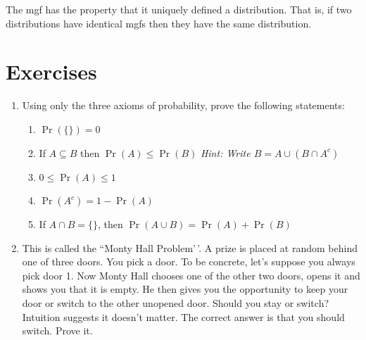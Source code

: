 \documentclass[
]{book}
\providecommand{\tightlist}{%
  \setlength{\itemsep}{0pt}\setlength{\parskip}{0pt}}
\theoremstyle{definition}
\theoremstyle{definition}
\theoremstyle{definition}
\theoremstyle{definition}
\theoremstyle{remark}
\begin{document}
The mgf has the property that it uniquely defined a distribution.
That is, if two distributions have identical mgfs then they have the same distribution.

\hypertarget{exercises}{%
\section{Exercises}\label{exercises}}

\begin{enumerate}
\def\labelenumi{\arabic{enumi}.}
\item
  Using only the three axioms of probability, prove the following statements:

  \begin{enumerate}
  \def\labelenumii{(\alph{enumii})}
  \tightlist
  \item
    \(\Pr(\{\})=0\)
  \item
    If \(A \subseteq B\) then \(\Pr(A) \leq \Pr(B)\) \emph{Hint: Write \(B = A \cup (B \cap A^c)\)}
  \item
    \(0 \leq \Pr(A) \leq 1\)
  \item
    \(\Pr(A^c)=1-\Pr(A)\)
  \item
    If \(A \cap B = \{\}\), then \(\Pr(A\cup B) = \Pr(A) + \Pr(B)\)
  \end{enumerate}
\item
  This is called the ``Monty Hall Problem'\,'. A prize is placed at random behind one of three doors. You pick a door. To be concrete, let's suppose you always pick door 1. Now Monty Hall chooses one of the other two doors, opens it and shows you that it is empty. He then gives you the opportunity to keep your door or switch to the other unopened door. Should you stay or switch? Intuition suggests it doesn't matter. The correct answer is that you should switch. Prove it.


\end{enumerate}
\end{document}
